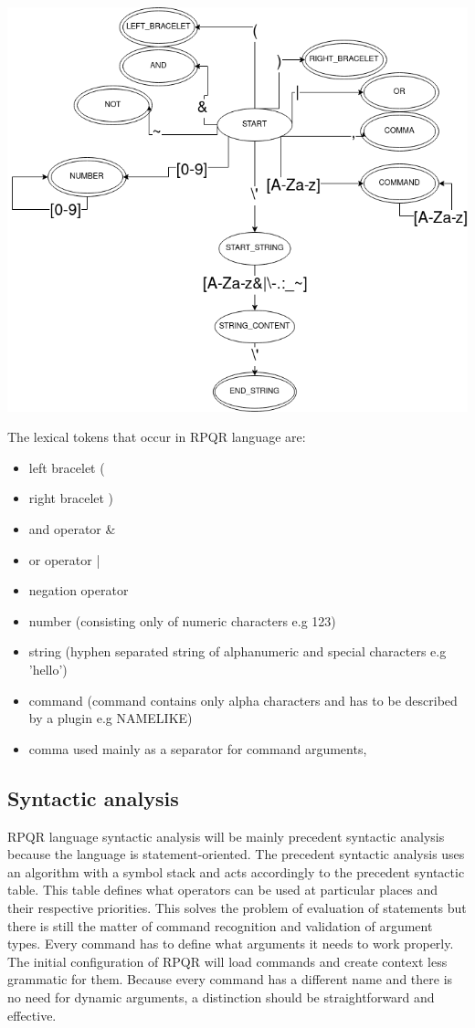 \includegraphics[scale=0.5]{obrazky-figures/RPQR_FSM.png}

\newpage

The lexical tokens that occur in RPQR language are:
\begin{itemize}
  \item left bracelet (
  \item right bracelet )
  \item and operator \&
  \item or operator |
  \item negation operator ~
  \item number (consisting only of numeric characters e.g 123)
  \item string (hyphen separated string of alphanumeric and special characters e.g 'hello')
  \item command (command contains only alpha characters and has to be described by a plugin e.g NAMELIKE)
  \item comma used mainly as a separator for command arguments,
\end{itemize}

\subsection*{Syntactic analysis}
RPQR language syntactic analysis will be mainly precedent syntactic analysis because the language is statement-oriented. The precedent syntactic analysis uses an algorithm with a symbol stack and acts accordingly to the precedent
syntactic table. This table defines what operators can be used at particular places and their respective
priorities. This solves the problem of evaluation of statements but there is still the matter of command
recognition and validation of argument types. Every command has to define what arguments it needs to work
properly. The initial configuration of RPQR will load commands and create context less grammatic for them.
Because every command has a different name and there is no need for dynamic arguments, a distinction should
be straightforward and effective.

